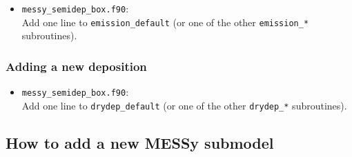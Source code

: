 \documentclass[twoside]{article}
\def\nosep{\setlength\parsep{0mm}\setlength\topsep{0mm}\setlength\itemsep{0mm}}
\begin{document}
\begin{itemize}\nosep
\item \verb|messy_semidep_box.f90|:\\
  Add one line to \verb|emission_default| (or one of the other
  \verb|emission_*| subroutines).
\end{itemize}

\subsubsection{Adding a new deposition}

\begin{itemize}\nosep
\item \verb|messy_semidep_box.f90|:\\
  Add one line to \verb|drydep_default| (or one of the other
  \verb|drydep_*| subroutines).
\end{itemize}

\subsection{How to add a new MESSy submodel}
\end{document}
